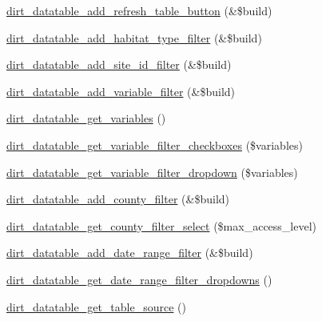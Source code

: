 \begin{DoxyCompactItemize}
\item 
\mbox{\hyperlink{dirt__datatable_8data__search__portal_8inc_ad9e638ffde681db24f1d782298e4c9b7}{dirt\+\_\+datatable\+\_\+add\+\_\+refresh\+\_\+table\+\_\+button}} (\&\$build)
\item 
\mbox{\hyperlink{dirt__datatable_8data__search__portal_8inc_ad5cecc2149c396c6797cbcbff18887af}{dirt\+\_\+datatable\+\_\+add\+\_\+habitat\+\_\+type\+\_\+filter}} (\&\$build)
\item 
\mbox{\hyperlink{dirt__datatable_8data__search__portal_8inc_a7548b73967e231ace5ef0df40fbe2ee5}{dirt\+\_\+datatable\+\_\+add\+\_\+site\+\_\+id\+\_\+filter}} (\&\$build)
\item 
\mbox{\hyperlink{dirt__datatable_8data__search__portal_8inc_ad364de4ddc971e6a5a286802386918d1}{dirt\+\_\+datatable\+\_\+add\+\_\+variable\+\_\+filter}} (\&\$build)
\item 
\mbox{\hyperlink{dirt__datatable_8data__search__portal_8inc_a13fd248b4d46c910182783601b98040d}{dirt\+\_\+datatable\+\_\+get\+\_\+variables}} ()
\item 
\mbox{\hyperlink{dirt__datatable_8data__search__portal_8inc_a0ad1ff76be8df008f1deb0391d852927}{dirt\+\_\+datatable\+\_\+get\+\_\+variable\+\_\+filter\+\_\+checkboxes}} (\$variables)
\item 
\mbox{\hyperlink{dirt__datatable_8data__search__portal_8inc_af477a5d9fed0f41548aebebb6999acb3}{dirt\+\_\+datatable\+\_\+get\+\_\+variable\+\_\+filter\+\_\+dropdown}} (\$variables)
\item 
\mbox{\hyperlink{dirt__datatable_8data__search__portal_8inc_a9a3cc28f1f4dc554b034f776fbd69eca}{dirt\+\_\+datatable\+\_\+add\+\_\+county\+\_\+filter}} (\&\$build)
\item 
\mbox{\hyperlink{dirt__datatable_8data__search__portal_8inc_acecff4c3a5e4c22b1becb98232f67d96}{dirt\+\_\+datatable\+\_\+get\+\_\+county\+\_\+filter\+\_\+select}} (\$max\+\_\+access\+\_\+level)
\item 
\mbox{\hyperlink{dirt__datatable_8data__search__portal_8inc_aa14f235e1645c3a32a8aaf4e49077a8a}{dirt\+\_\+datatable\+\_\+add\+\_\+date\+\_\+range\+\_\+filter}} (\&\$build)
\item 
\mbox{\hyperlink{dirt__datatable_8data__search__portal_8inc_a06b4874ea8dd2733f08fbb0b70fe487b}{dirt\+\_\+datatable\+\_\+get\+\_\+date\+\_\+range\+\_\+filter\+\_\+dropdowns}} ()
\item 
\mbox{\hyperlink{dirt__datatable_8data__search__portal_8inc_ad48386267371fa82c730e59ba1fa368e}{dirt\+\_\+datatable\+\_\+get\+\_\+table\+\_\+source}} ()

\end{DoxyCompactItemize}

